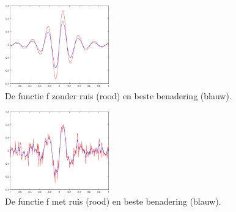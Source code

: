 \documentclass[a4paper]{article}
\begin{document}
\begin{figure}[H]
	\begin{center} 
		\includegraphics[width=0.4\textwidth]{PlotSplinesNoNoise.eps}
	\end{center}
	\caption{De functie f zonder ruis (rood) en beste benadering (blauw).}
	\label{fig:plotNoNoise}
\end{figure}

\begin{figure}[H]
	\begin{center} 
		\includegraphics[width=0.4\textwidth]{PlotSplinesNoise.eps}
	\end{center}
	\caption{De functie f met ruis (rood) en beste benadering (blauw).}
	\label{fig:plotNoise}
\end{figure}
\end{document}

